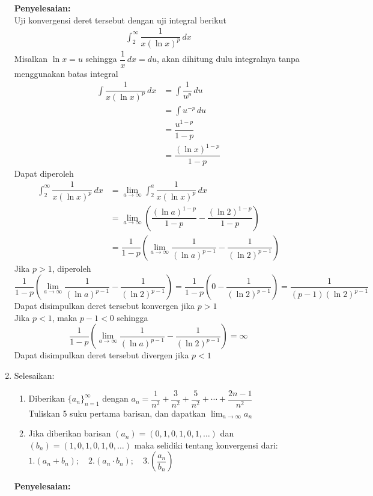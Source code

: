 \documentclass{article}
\begin{document}
\begin{enumerate}
	\textbf{Penyelesaian:}\\
	Uji konvergensi deret tersebut dengan uji integral berikut
	\begin{align*}
	\int_2^\infty \dfrac{1}{x(\ln x)^p}\, dx
	\end{align*}
	Misalkan $\ln x=u$ sehingga $\dfrac{1}{x}\, dx=du$, akan dihitung dulu integralnya tanpa menggunakan batas integral
	\begin{align*}
	\int \dfrac{1}{x(\ln x)^p}\, dx &= \int \dfrac{1}{u^p} \,du\\
	&= \int u^{-p} \, du\\
	&= \dfrac{u^{1-p}}{1-p}\\
	&= \dfrac{(\ln x)^{1-p}}{1-p}
	\end{align*}
	Dapat diperoleh 
	\begin{align*}
	\int_2^\infty \dfrac{1}{x(\ln x)^p}\, dx &= \lim_{a\rightarrow\infty} \int_2^a \dfrac{1}{x(\ln x)^p}\, dx\\
	&= \lim_{a\rightarrow\infty} \left(\dfrac{(\ln a)^{1-p}}{1-p}-\dfrac{(\ln 2)^{1-p}}{1-p}\right)\\
	&= \dfrac{1}{1-p}\left( \lim_{a\rightarrow\infty} \dfrac{1}{(\ln a)^{p-1}}-\dfrac{1}{(\ln 2)^{p-1}}\right)
	\end{align*}
	Jika $p>1$, diperoleh
	 $$\dfrac{1}{1-p}\left( \lim_{a\rightarrow\infty} \dfrac{1}{(\ln a)^{p-1}}-\dfrac{1}{(\ln 2)^{p-1}}\right) = \dfrac{1}{1-p}\left(0-\dfrac{1}{(\ln 2)^{p-1}}\right) = \dfrac{1}{(p-1)(\ln 2)^{p-1}}$$
	Dapat disimpulkan deret tersebut konvergen jika $p>1$\\
	Jika $p<1$, maka $p-1<0$ sehingga
	 $$\dfrac{1}{1-p}\left( \lim_{a\rightarrow\infty} \dfrac{1}{(\ln a)^{p-1}}-\dfrac{1}{(\ln 2)^{p-1}}\right) = \infty$$
	Dapat disimpulkan deret tersebut divergen jika $p<1$
	\item Selesaikan:
	\begin{enumerate}
		\item Diberikan $\{a_n\}^\infty_{n=1}$ dengan $a_n=\dfrac{1}{n^2}+\dfrac{3}{n^2}+\dfrac{5}{n^2}+\cdots +\dfrac{2n-1}{n^2}$\\
		Tuliskan 5 suku pertama barisan, dan dapatkan $\displaystyle \lim_{n\rightarrow \infty} a_n$
		\item Jika diberikan barisan $(a_n)=(0,1,0,1,0,1,\dots)$ dan $(b_n)=(1,0,1,0,1,0,\dots)$ maka selidiki tentang konvergensi dari: $1. (a_n+b_n);\quad 2. (a_n\cdot b_n);\quad 3. \left(\dfrac{a_n}{b_n}\right)$
	\end{enumerate}
	\textbf{Penyelesaian:}
	\begin{enumerate}

\end{enumerate}
\end{enumerate}
\end{document}
